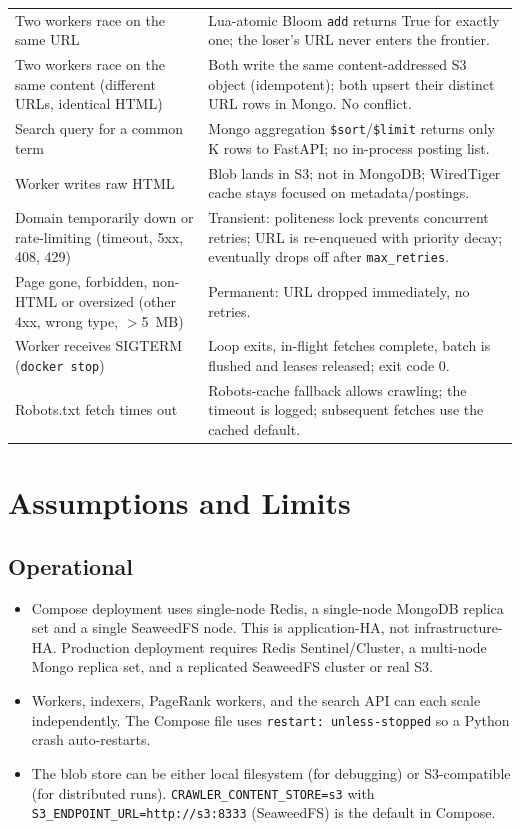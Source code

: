 \documentclass[11pt,a4paper]{article}
\newcommand{\code}[1]{\texttt{#1}}
\begin{document}
\begin{table}[H]
\begin{tabular}{p{}p{}}
Two workers race on the same URL & Lua-atomic Bloom \code{add} returns True for exactly one; the loser's URL never enters the frontier.\\
Two workers race on the same content (different URLs, identical HTML) & Both write the same content-addressed S3 object (idempotent); both upsert their distinct URL rows in Mongo. No conflict.\\
Search query for a common term & Mongo aggregation \code{\$sort}/\code{\$limit} returns only K rows to FastAPI; no in-process posting list.\\
Worker writes raw HTML & Blob lands in S3; not in MongoDB; WiredTiger cache stays focused on metadata/postings.\\
Domain temporarily down or rate-limiting (timeout, 5xx, 408, 429) & Transient: politeness lock prevents concurrent retries; URL is re-enqueued with priority decay; eventually drops off after \code{max\_retries}.\\
Page gone, forbidden, non-HTML or oversized (other 4xx, wrong type, $>$5~MB) & Permanent: URL dropped immediately, no retries.\\
Worker receives SIGTERM (\code{docker stop}) & Loop exits, in-flight fetches complete, batch is flushed and leases released; exit code 0.\\
Robots.txt fetch times out & Robots-cache fallback allows crawling; the timeout is logged; subsequent fetches use the cached default.\\
\bottomrule
\end{tabular}
\normalsize
\end{table}

\section{Assumptions and Limits}

\subsection{Operational}

\begin{itemize}[leftmargin=1.4em]
  \item Compose deployment uses single-node Redis, a single-node MongoDB replica set and a single SeaweedFS node. This is application-HA, not infrastructure-HA. Production deployment requires Redis Sentinel/Cluster, a multi-node Mongo replica set, and a replicated SeaweedFS cluster or real S3.
  \item Workers, indexers, PageRank workers, and the search API can each scale independently. The Compose file uses \code{restart: unless-stopped} so a Python crash auto-restarts.
  \item The blob store can be either local filesystem (for debugging) or S3-compatible (for distributed runs). \code{CRAWLER\_CONTENT\_STORE=s3} with \code{S3\_ENDPOINT\_URL=http://s3:8333} (SeaweedFS) is the default in Compose.
\end{itemize}
\end{document}

